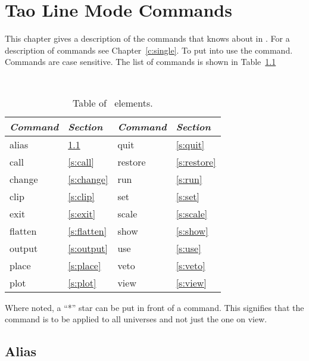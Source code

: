 \chapter{Tao Line Mode Commands}
\label{c:commands}

This chapter gives a description of the commands that \tao knows about
in . For a description of  commands
see Chapter~\ref{c:single}. To put \tao into  use the
 command.
Commands are case sensitive. The list of commands 
is shown in Table~\ref{t:commands}

\begin{table}[h]
\centering
{\tt
\begin{tabular}{|l|l||l|l|} \hline
  {\it Command} & {\it Section}  & {\it Command} & {\it Section} \\ \hline
  alias    & \ref{s:alias}    &  quit    & \ref{s:quit}    \\ \hline
  call     & \ref{s:call}     &  restore & \ref{s:restore} \\ \hline
  change   & \ref{s:change}   &  run     & \ref{s:run}     \\ \hline
  clip     & \ref{s:clip}     &  set     & \ref{s:set}     \\ \hline
  exit     & \ref{s:exit}     &  scale   & \ref{s:scale}   \\ \hline
  flatten  & \ref{s:flatten}  &  show    & \ref{s:show}    \\ \hline
  output   & \ref{s:output}   &  use     & \ref{s:use}     \\ \hline
  place    & \ref{s:place}    &  veto    & \ref{s:veto}    \\ \hline
  plot     & \ref{s:plot}     &  view    & \ref{s:view}    \\ \hline
\end{tabular}
}
\caption{Table of \bmad\ elements.}
\label{t:commands}\center
\end{table}

Where noted, a ``*'' star can be put in front of a command. This
signifies that the command is to be applied to all universes and not
just the one on view.

\vfil
\break

\section{Alias}
\label{s:alias}

